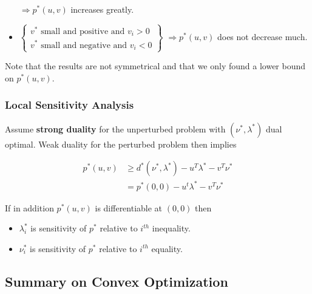 \documentclass[8pt,a4paper]{scrartcl}
\begin{document}
\begin{multicols*}{3}
\begin{itemize}
$\Rightarrow p^\ast(u,v)$ increases greatly.
\item $\left\{\begin{matrix}
v^\ast\text{ small and positive and }v_i>0\\
v^\ast\text{ small and negative and }v_i<0
\end{matrix}\right\}$
$\Rightarrow p^\ast(u,v)$ does not decrease much.
\end{itemize}

Note that the results are not symmetrical and that we only found a lower bound on $p^\ast(u,v)$.

\subsubsection{Local Sensitivity Analysis}

Assume \textbf{strong duality} for the unperturbed problem with $(\nu^\ast,\lambda^\ast)$ dual optimal. Weak duality for the perturbed problem then implies

\begin{align*}
p^\ast(u,v)&\geq d^\ast(\nu^\ast,\lambda^\ast)-u^T\lambda^\ast-v^T\nu^\ast\\
&=p^\ast(0,0)-u^t\lambda^\ast-v^T\nu^\ast
\end{align*}

If in addition $p^\ast(u,v)$ is differentiable at $(0,0)$ then 


\begin{itemize}
\item $\lambda_i^\ast$ is sensitivity of $p^\ast$ relative to $i^{th}$ inequality.
\item $\nu_i^\ast$ is sensitivity of $p^\ast$ relative to $i^{th}$ equality.
\end{itemize}

\subsection{Summary on Convex Optimization}


\end{multicols*}
\end{document}
